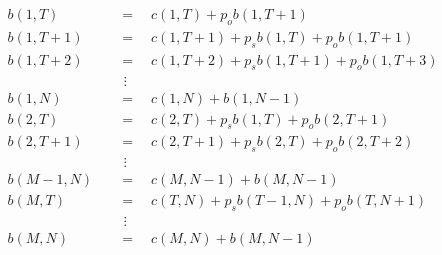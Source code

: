 \begin{align}
    b(1,T) \quad &= \quad c(1, T) + p_o b(1, T + 1) \label{eq:first_eq_of_blocking_general}\\
    b(1,T + 1) \quad &= \quad c(1, T + 1) + p_s b(1, T) + p_o b(1, T + 1) \\
    b(1,T + 2) \quad &= \quad c(1, T + 2) + p_s b(1, T + 1) + p_o b(1, T + 3) \\
    & \ \, \vdots \nonumber \\
    b(1, N) \quad &= \quad c(1, N) + b(1, N - 1) \\
    b(2, T) \quad &= \quad c(2, T) + p_s b(1, T) + p_o b(2, T + 1) \\
    b(2, T + 1) \quad &= \quad c(2, T + 1) + p_s b(2, T) + p_o b(2, T + 2) \\
    & \ \, \vdots \nonumber \\
    b(M - 1, N) \quad &= \quad c(M, N - 1) + b(M, N-1) \\ 
    b(M, T) \quad &= \quad c(T, N) + p_s b(T-1, N) + p_o b(T, N+1) \\
    & \ \, \vdots \nonumber \\
    b(M, N) \quad &= \quad c(M, N) + b(M, N-1) \label{eq:last_eq_of_blocking_general}
\end{align}

